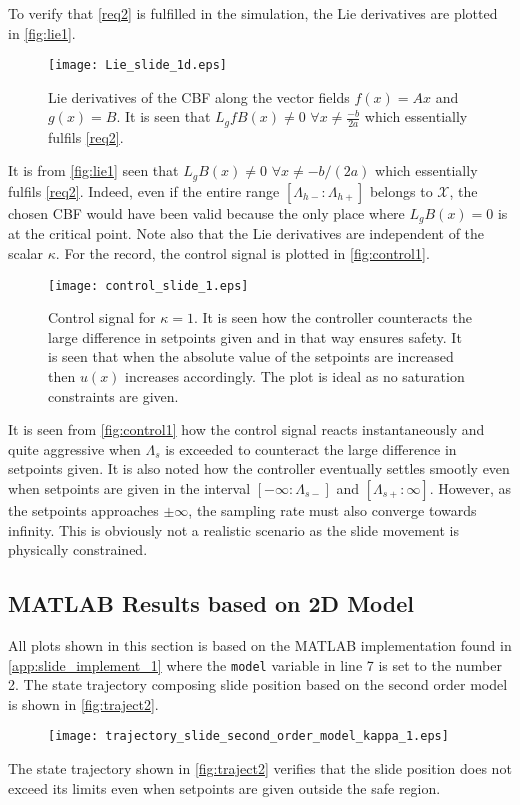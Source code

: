 To verify that \autoref{req2} is fulfilled in the simulation, the Lie derivatives are plotted in \autoref{fig:lie1}.
\begin{figure}[H]
	\center
		\texttt{[image: Lie\_slide\_1d.eps]}
	\caption{Lie derivatives of the CBF along the vector fields $f(x) = Ax$ and $g(x)=B$. It is seen that $L_gfB(x) \neq 0 \,\, \forall x \neq \frac{-b}{2a}$ which essentially fulfils \autoref{req2}.}
	\label{fig:lie1}
\end{figure}
It is from \autoref{fig:lie1} seen that $L_gB(x) \neq 0 \,\, \forall x \neq -b/(2a)$ which essentially fulfils \autoref{req2}. Indeed, even if the entire range $[\Lambda_{h-}:\Lambda_{h+}]$ belongs to $\mathcal{X}$, the chosen CBF would have been valid because the only place where $L_gB(x) = 0$ is at the critical point. Note also that the Lie derivatives are independent of the scalar $\kappa$.
For the record, the control signal is plotted in \autoref{fig:control1}.
\begin{figure}[H]
	\center
		\texttt{[image: control\_slide\_1.eps]}
	\caption{Control signal for $\kappa=1$. It is seen how the controller counteracts the large difference in setpoints given and in that way ensures safety. It is seen that when the absolute value of the setpoints are increased then $u(x)$ increases accordingly. The plot is ideal as no saturation constraints are given.}
	\label{fig:control1}
\end{figure}
It is seen from \autoref{fig:control1} how the control signal reacts instantaneously and quite aggressive when $\Lambda_s$ is exceeded to counteract the large difference in setpoints given. It is also noted how the controller eventually settles smootly even when setpoints are given in the interval $[-\infty:\Lambda_{s-}]$ and $[\Lambda_{s+}:\infty]$. However, as the setpoints approaches $\pm \infty$, the sampling rate must also converge towards infinity. This is obviously not a realistic scenario as the slide movement is physically constrained.
\subsection{MATLAB Results based on 2D Model}
All plots shown in this section is based on the MATLAB implementation found in \autoref{app:slide_implement_1} where the \texttt{model} variable in line 7 is set to the number 2. The state trajectory composing slide position based on the second order model is shown in \autoref{fig:traject2}.
\begin{figure}[H]
	\center
		\texttt{[image: trajectory\_slide\_second\_order\_model\_kappa\_1.eps]}
	\caption{}
	\label{fig:traject2}
\end{figure}
The state trajectory shown in \autoref{fig:traject2} verifies that the slide position does not exceed its limits even when setpoints are given outside the safe region.

